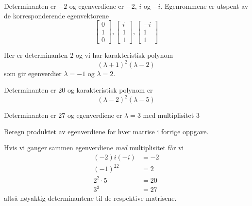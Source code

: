 \begin{losning}
	\begin{punkt}
		Determinanten er $-2$ og egenverdiene er $-2$, $i$ og $-i$. Egenrommene er utspent av de korresponderende egenvektorene
		\begin{equation*}
			\begin{bmatrix}
				0 \\ 1 \\ 0
			\end{bmatrix}
			,
			\begin{bmatrix}
				i \\ 1 \\ 1
			\end{bmatrix}
			,
			\begin{bmatrix}
				-i \\ 1 \\ 1
			\end{bmatrix}
		\end{equation*}
	\end{punkt}
	\begin{punkt}
		Her er determinanten $2$ og vi har karakteristisk polynom
		\begin{equation*}
			(\lambda + 1)^2(\lambda - 2)
		\end{equation*}
		som gir egenverdier $\lambda  = -1$ og $\lambda = 2$.
		
	\end{punkt}

	\begin{punkt}
		Determinanten er $20$ og karakteristisk polynom er 
		\begin{equation*}
			(\lambda - 2)^2(\lambda - 5)
		\end{equation*}
	\end{punkt}

	\begin{punkt}
		Determinanten er $27$ og egenverdiene er $\lambda = 3$ med multiplisitet 3
	\end{punkt}

\end{losning}

\begin{oppgave}
Beregn produktet av egenverdiene for hver matrise i forrige oppgave.
\end{oppgave}

\begin{losning}
	Hvis vi ganger sammen egenverdiene \emph{med} multiplisitet får vi
	\begin{align*}
		(-2)i(-i) &= -2 \\
		(-1)^22 &= 2 \\
		2^2\cdot 5 &= 20 \\
		3^3 & = 27
	\end{align*}
	altså nøyaktig determinantene til de respektive matrisene.
\end{losning}

